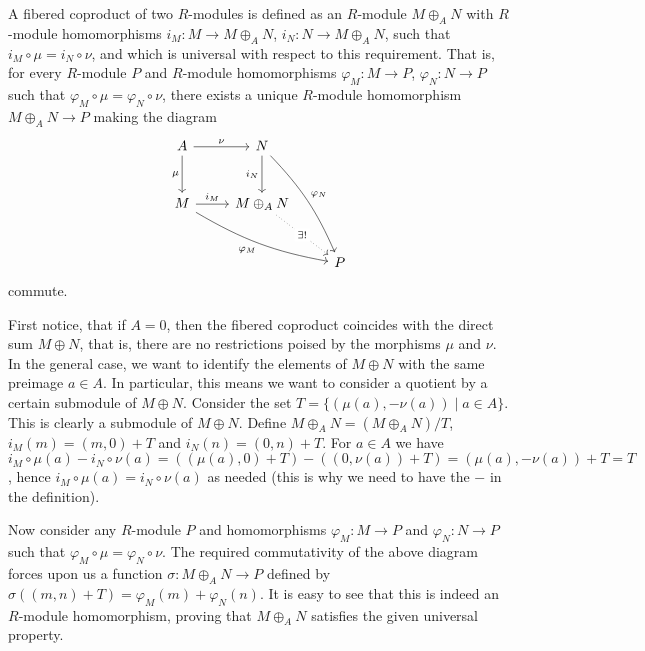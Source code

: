 \begin{solution}
	A fibered coproduct of two $R$-modules is defined as an $R$-module $M \oplus_A N$ with $R$-module homomorphisms $i_M: M \to M \oplus_A N$, $i_N: N \to M \oplus_A N$, such that $i_M \circ \mu = i_N \circ \nu$, and which is universal with respect to this requirement. That is, for every $R$-module $P$ and $R$-module homomorphisms $\varphi_M: M \to P$, $\varphi_N: N \to P$ such that $\varphi_M \circ \mu = \varphi_N \circ \nu$, there exists a unique $R$-module homomorphism $M \oplus_A N \to P$ making the diagram
	\begin{equation*}
		\begin{tikzcd}[row sep=large]
			A
			\arrow[r, "\nu"]
			\arrow[d, "\mu"']
			& N
			\arrow[d, "i_N"']
			\arrow[ddr, bend left=10, "\varphi_N"]
			& \\
			M
			\arrow[r, "i_M"]
			\arrow[drr, bend right=10, "\varphi_M"']
			& M \oplus_A N 
			\arrow[dr, dotted, "\exists!" description]
			& \\
			& & P
		\end{tikzcd}
	\end{equation*}
	commute.
	
	First notice, that if $A = 0$, then the fibered coproduct coincides with the direct sum $M \oplus N$, that is, there are no restrictions poised by the morphisms $\mu$ and $\nu$. In the general case, we want to identify the elements of $M \oplus N$ with the same preimage $a \in A$. In particular, this means we want to consider a quotient by a certain submodule of $M \oplus N$. Consider the set $T = \{ (\mu(a), -\nu(a)) \mid a \in A \}$. This is clearly a submodule of $M \oplus N$. Define $M \oplus_A N = (M \oplus_A N)/T$, $i_M(m) = (m, 0) + T$ and $i_N(n) = (0, n) + T$. For $a \in A$ we have $i_M \circ \mu(a) - i_N \circ \nu(a) = ((\mu(a), 0) + T) - ((0, \nu(a)) + T) = (\mu(a), -\nu(a)) + T = T$, hence $i_M \circ \mu(a) = i_N \circ \nu(a)$ as needed (this is why we need to have the $-$ in the definition).
	
	Now consider any $R$-module $P$ and homomorphisms $\varphi_M: M \to P$ and $\varphi_N: N \to P$ such that $\varphi_M \circ \mu = \varphi_N \circ \nu$. The required commutativity of the above diagram forces upon us a function $\sigma: M \oplus_A N \to P$ defined by $\sigma((m, n) + T) = \varphi_M(m) + \varphi_N(n)$. It is easy to see that this is indeed an $R$-module homomorphism, proving that $M \oplus_A N$ satisfies the given universal property.
\end{solution}

